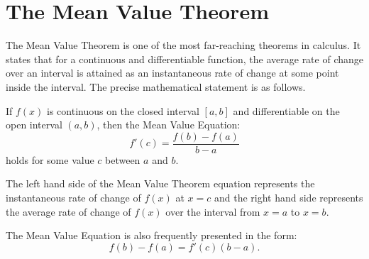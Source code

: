 \documentclass{ximera}
\begin{document}
\section{The Mean Value Theorem}


The Mean Value Theorem is one of the most far-reaching theorems in calculus. It states that for a continuous 
and differentiable function, the average rate of change over an interval is attained as an 
instantaneous rate of change at some point inside the interval. The precise mathematical statement is as follows.\\

\begin{theorem}
If $f(x)$ is continuous on the closed interval $[a,b]$ and differentiable on the 
open interval $(a,b)$, then the Mean Value Equation:
\[f'(c) = \frac{f(b) - f(a)}{b-a}\]
holds for some value $c$ between $a$ and $b$.\\
\end{theorem}




The left hand side of the Mean Value Theorem equation represents the instantaneous rate of change of $f(x)$ at $x = c$ and the
right hand side represents the average rate of change of $f(x)$ over the interval from $x=a$ to $x=b$.

\begin{image}
\end{image}








The Mean Value Equation is also frequently presented in the form:
\[f(b) - f(a)=f'(c)(b-a).\]
\end{document}
